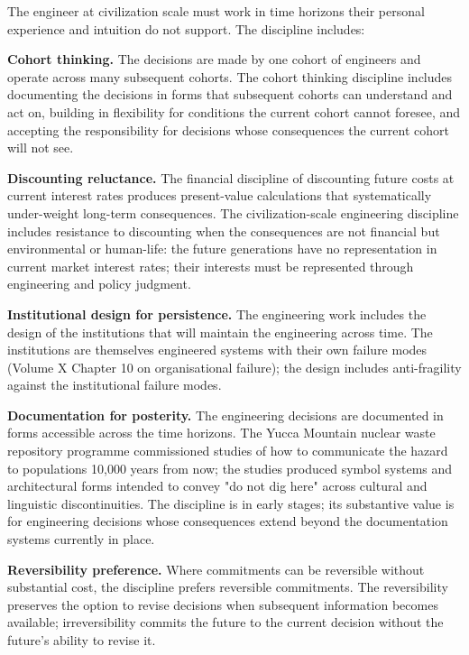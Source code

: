 The engineer at civilization scale must work in time horizons their personal experience and intuition do not support. The discipline includes:

\textbf{Cohort thinking.} The decisions are made by one cohort of engineers and operate across many subsequent cohorts. The cohort thinking discipline includes documenting the decisions in forms that subsequent cohorts can understand and act on, building in flexibility for conditions the current cohort cannot foresee, and accepting the responsibility for decisions whose consequences the current cohort will not see.

\textbf{Discounting reluctance.} The financial discipline of discounting future costs at current interest rates produces present-value calculations that systematically under-weight long-term consequences. The civilization-scale engineering discipline includes resistance to discounting when the consequences are not financial but environmental or human-life: the future generations have no representation in current market interest rates; their interests must be represented through engineering and policy judgment.

\textbf{Institutional design for persistence.} The engineering work includes the design of the institutions that will maintain the engineering across time. The institutions are themselves engineered systems with their own failure modes (Volume X Chapter 10 on organisational failure); the design includes anti-fragility against the institutional failure modes.

\textbf{Documentation for posterity.} The engineering decisions are documented in forms accessible across the time horizons. The Yucca Mountain nuclear waste repository programme commissioned studies of how to communicate the hazard to populations 10{,}000 years from now; the studies produced symbol systems and architectural forms intended to convey "do not dig here" across cultural and linguistic discontinuities. The discipline is in early stages; its substantive value is for engineering decisions whose consequences extend beyond the documentation systems currently in place.

\textbf{Reversibility preference.} Where commitments can be reversible without substantial cost, the discipline prefers reversible commitments. The reversibility preserves the option to revise decisions when subsequent information becomes available; irreversibility commits the future to the current decision without the future's ability to revise it.

